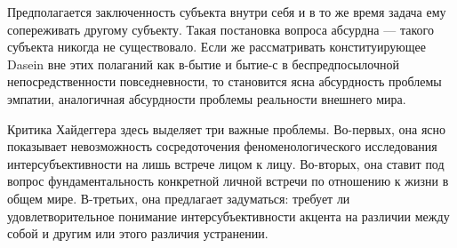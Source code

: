\documentclass[11pt]{book}
\begin{document}
\smallskip
{}\relax
{}\relax

Предполагается заключенность субъекта внутри себя и в то же время задача ему сопереживать другому субъекту. Такая постановка вопроса абсурдна --- такого субъекта никогда не существовало. Если же рассматривать конституирующее Dasein вне этих полаганий как в-бытие и бытие-с в беспредпосылочной непосредственности повседневности, то становится ясна абсурдность проблемы эмпатии, аналогичная абсурдности проблемы реальности внешнего мира.

\relax
{}\relax
\smallskip

Критика Хайдеггера здесь выделяет три важные проблемы. Во-первых, она ясно показывает невозможность сосредоточения феноменологического исследования интерсубъективности на лишь встрече лицом к лицу. Во-вторых, она ставит под вопрос фундаментальность конкретной личной встречи по отношению к жизни в общем мире. В-третьих, она предлагает задуматься: требует ли удовлетворительное понимание интерсубъективности акцента на различии между собой и другим или этого различия устранении.
\end{document}
